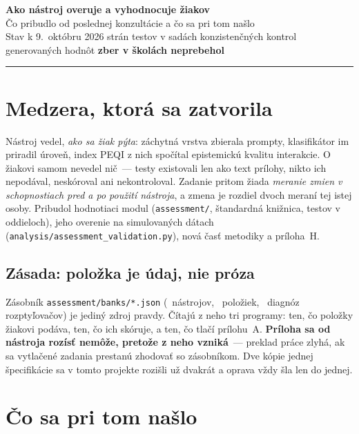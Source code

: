 \documentclass[9.5pt,a4paper]{article}
\begin{document}
{\LARGE\bfseries Ako nástroj overuje a vyhodnocuje žiakov}\\[2pt]
{\large\color{warn} Čo pribudlo od poslednej konzultácie a čo sa pri tom našlo}\\[4pt]
{\small\color{warn} Stav k 9.~októbru 2026 \quad\textbullet{} strán \quad\textbullet\quad
\repoTests{} testov v \repoSuites{} sadách \quad\textbullet\quad \repoChecks{} konzistenčných
kontrol \quad\textbullet\quad \repoMacros{} generovaných hodnôt \quad\textbullet\quad
\textbf{zber v školách neprebehol}}

\vspace{2pt}\textcolor{rule}{\hrule}\vspace{4pt}

\section{Medzera, ktorá sa zatvorila}

Nástroj vedel, \emph{ako sa žiak pýta}: záchytná vrstva zbierala prompty,
klasifikátor im priradil úroveň, index PEQI z nich spočítal epistemickú kvalitu
interakcie. O žiakovi samom nevedel nič~--- testy existovali len ako text
prílohy, nikto ich nepodával, neskóroval ani nekontroloval. Zadanie pritom žiada
\emph{meranie zmien v schopnostiach pred a po použití nástroja}, a zmena je
rozdiel dvoch meraní tej istej osoby. Pribudol hodnotiaci modul
(\texttt{assessment/}, štandardná knižnica, \instrTests{} testov v
\instrTestSections{} oddieloch), jeho overenie na simulovaných dátach
(\texttt{analysis/assessment\_validation.py}), nová časť metodiky a príloha~H.

\subsection{Zásada: položka je údaj, nie próza}

Zásobník \texttt{assessment/banks/*.json} (\asmBanks{}~nástrojov,
\asmItems{}~položiek, \asmDistractorsDiagnosed{}~diagnóz rozptyľovačov) je
jediný zdroj pravdy. Čítajú z neho tri programy: ten, čo položky žiakovi
podáva, ten, čo ich skóruje, a ten, čo tlačí prílohu~A. \textbf{Príloha sa od
nástroja rozísť nemôže, pretože z neho vzniká}~--- preklad práce zlyhá, ak sa
vytlačené zadania prestanú zhodovať so zásobníkom. Dve kópie jednej
špecifikácie sa v tomto projekte rozišli už dvakrát a oprava vždy šla len do
jednej.

\section{Čo sa pri tom našlo}
\end{document}
